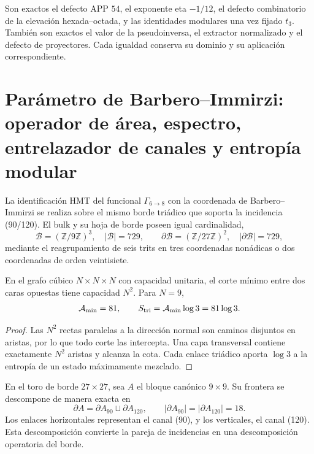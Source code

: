 \begin{remark}
Son exactos el defecto APP \(54\), el exponente eta \(-1/12\), el defecto
combinatorio de la elevación hexada--octada, y las
identidades modulares una vez fijado \(t_3\). También son exactos el valor
de la pseudoinversa, el extractor normalizado y el defecto de proyectores.
Cada igualdad conserva su dominio y su aplicación correspondiente.
\end{remark}


\section{Parámetro de Barbero--Immirzi: operador de área, espectro,
entrelazador de canales y entropía modular}
\label{p12-83-c14-s2:sec:area-entrelazamiento-barbero-rev11}

La identificación HMT del funcional \(\Gamma_{6\to8}\) con la coordenada
de Barbero--Immirzi se realiza sobre el mismo borde triádico que soporta la
incidencia (90/120). El bulk y su hoja de borde poseen igual cardinalidad,
\[
 \mathcal B=(\mathbb Z/9\mathbb Z)^3,
 \quad |\mathcal B|=729,
 \qquad
 \partial\mathcal B=(\mathbb Z/27\mathbb Z)^2,
 \quad |\partial\mathcal B|=729,
\]
mediante el reagrupamiento de seis trits en tres coordenadas nonádicas o dos
coordenadas de orden veintisiete.

\begin{theorem}
\label{p12-83-c14-s2:thm:ley-areal-corte-triadico-rev11}
En el grafo cúbico \(N\times N\times N\) con capacidad unitaria, el corte
mínimo entre dos caras opuestas tiene capacidad \(N^2\). Para \(N=9\),
\[
 \mathcal A_{\min}=81,
 \qquad S_{\rm tri}=\mathcal A_{\min}\log3=81\log3.
\]
\end{theorem}
\begin{proof}
Las \(N^2\) rectas paralelas a la dirección normal son caminos disjuntos en
aristas, por lo que todo corte las intercepta. Una capa transversal contiene
exactamente \(N^2\) aristas y alcanza la cota. Cada enlace triádico aporta
\(\log3\) a la entropía de un estado máximamente mezclado.
\end{proof}

En el toro de borde \(27\times27\), sea \(A\) el bloque canónico
\(9\times9\). Su frontera se descompone de manera exacta en
\begin{equation}
 \partial A=\partial A_{90}\sqcup\partial A_{120},
 \qquad |\partial A_{90}|=|\partial A_{120}|=18.
 \label{p12-83-c14-s2:eq:corte-90-120-rev11}
\end{equation}
Los enlaces horizontales representan el canal (90), y los verticales, el
canal (120). Esta descomposición convierte la pareja de incidencias en una
descomposición operatoria del borde.

